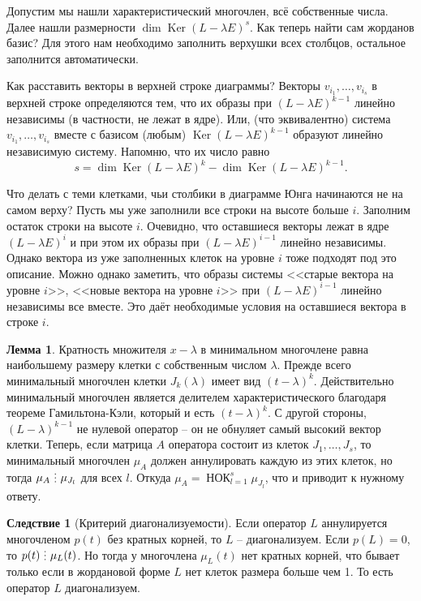 \documentclass[10pt,a4paper,oneside]{book} %
\theoremstyle{definition}
\newtheorem{lem}{Лемма}
\newtheorem{cor}{Следствие}
\DeclareMathOperator{\Ker}{Ker}
\newcommand{\di}{\mathop{\,\scalebox{0.85}{\raisebox{-1.2pt}[0.5\height]{\vdots}}\,}}
\newcommand{\Nok}{\operatorname{\text{НОК}}}
\def\lm{\begin{lem}}
\def\elm{\end{lem}}
\def\crl{\begin{cor}}
\def\ecrl{\end{cor}}
\begin{document}
\endproof








Допустим мы нашли характеристический многочлен, всё собственные числа. Далее нашли размерности $\dim \Ker(L-\lambda E)^s$. Как теперь найти сам жорданов базис? Для этого нам необходимо заполнить верхушки всех столбцов, остальное заполнится автоматически.



Как расставить векторы в верхней строке диаграммы? Векторы $v_{i_1}, \dots, v_{i_s}$  в верхней строке определяются тем, что их образы при $(L-\lambda E)^{k-1}$ линейно независимы (в частности, не лежат в ядре). Или, (что эквивалентно) система $v_{i_1}, \dots, v_{i_s}$ вместе с базисом (любым) $\Ker (L-\lambda E)^{k-1}$ образуют линейно независимую систему. Напомню, что их число равно
$$s=\dim \Ker (L-\lambda E)^k - \dim \Ker (L-\lambda E)^{k-1}.$$



Что делать с теми клетками, чьи столбики в диаграмме Юнга начинаются не на самом верху? Пусть мы уже заполнили все строки на высоте больше $i$. Заполним остаток строки на высоте $i$.  Очевидно, что оставшиеся векторы лежат в ядре $(L-\lambda E)^{i}$ и при этом их образы при $(L-\lambda E)^{i-1}$ линейно независимы. Однако вектора из уже заполненных клеток на уровне $i$ тоже подходят под это описание. Можно однако заметить, что образы системы <<старые вектора на уровне $i$>>, <<новые вектора на уровне $i$>> при $(L-\lambda E)^{i-1}$ линейно независимы все вместе. Это даёт необходимые условия на оставшиеся вектора в строке $i$.


\lm
Кратность множителя $x-\lambda$ в минимальном многочлене равна наибольшему размеру клетки с собственным числом $\lambda$.
\proof Прежде всего минимальный многочлен клетки $J_k(\lambda)$ имеет вид $(t-\lambda)^k$. Действительно минимальный многочлен является делителем характеристического благодаря теореме Гамильтона-Кэли, который и есть $(t-\lambda)^k$. С другой стороны, $(L-\lambda)^{k-1}$ не нулевой оператор -- он не обнуляет самый высокий вектор клетки.
Теперь, если матрица $A$ оператора состоит из клеток $J_1,\dots, J_s$, то минимальный многочлен $\mu_A$ должен аннулировать каждую из этих клеток, но тогда $\mu_A \di \mu_{J_l}$ для всех $l$. Откуда $\mu_A= \Nok_{l=1}^s \mu_{J_l}$, что и приводит к нужному ответу.
\endproof
\elm

\crl[Критерий диагонализуемости] Если оператор $L$ аннулируется многочленом $p(t)$ без кратных корней, то $L$ -- диагонализуем.
\proof Если $p(L)=0$, то $p(t)\di \mu_L(t)$. Но тогда у многочлена $\mu_L(t)$ нет кратных корней, что бывает только если в жордановой форме $L$ нет клеток размера больше чем 1. То есть оператор $L$ диагонализуем. 
\endproof
\ecrl
\end{document}

